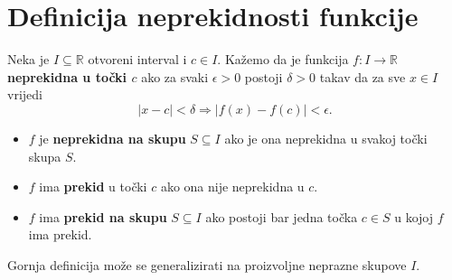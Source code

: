 \section{Definicija neprekidnosti funkcije}
\begin{definition}
Neka je $I\subseteq \mathbb{R}$ otvoreni interval i $c\in I$. Kažemo da je funkcija $f : I\to \mathbb{R}$ \textbf{neprekidna u točki $c$} ako za svaki $\epsilon>0$ postoji $\delta>0$ takav da za sve $x\in I$ vrijedi 
$$|x-c|<\delta\Rightarrow |f(x)-f(c)|<\epsilon.$$
\begin{itemize}
\item $f$ je \textbf{neprekidna na skupu} $S\subseteq I$ ako je ona neprekidna u svakoj točki skupa $S$.
\item $f$ ima \textbf{prekid} u točki $c$ ako ona nije neprekidna u $c$.
\item $f$ ima \textbf{prekid na skupu} $S\subseteq I$ ako postoji bar jedna točka $c\in S$ u kojoj $f$ ima prekid.
\end{itemize}
\end{definition}

\begin{remark}
Gornja definicija može se generalizirati na proizvoljne neprazne skupove $I$.
\end{remark}


